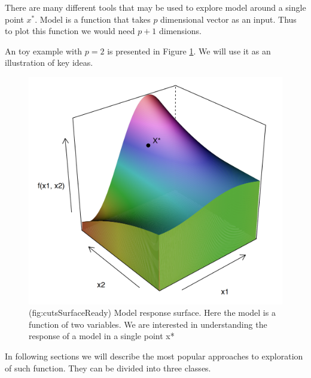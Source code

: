 \documentclass[]{krantz}
\theoremstyle{definition}
\theoremstyle{definition}
\theoremstyle{definition}
\theoremstyle{remark}
\begin{document}
There are many different tools that may be used to explore model around
a single point \(x^*\). Model is a function that takes \(p\) dimensional
vector as an input. Thus to plot this function we would need \(p+1\)
dimensions.

An toy example with \(p=2\) is presented in Figure
\ref{fig:cutsSurfaceReady}. We will use it as an illustration of key
ideas.

\begin{figure}

{\centering \includegraphics[width=0.6\linewidth]{figure/cuts_surface_ready_punkt} 

}

\caption{(fig:cutsSurfaceReady) Model response surface. Here the model is a function of two variables.  We are interested in understanding the response of a model in a single point x*}\label{fig:cutsSurfaceReady}
\end{figure}

In following sections we will describe the most popular approaches to
exploration of such function. They can be divided into three classes.
\end{document}
